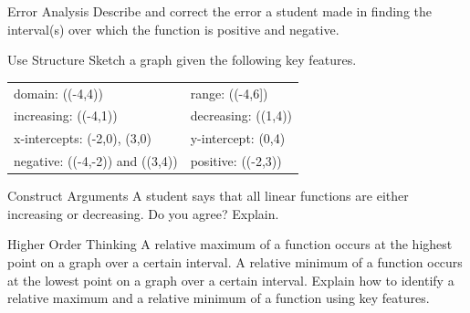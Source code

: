 \documentclass{article}
\newenvironment{practice}[2]{}{}        %
\newcommand{\answer}[1]{}               %
\newcommand{\placeholder}[2]{}          %
\newcommand{\te}[1]{}                   %
\begin{document}
\begin{practice}{13}{3}
Error Analysis Describe and correct the error a student made in finding the interval(s) over which the function is positive and negative.
\placeholder{graph}{Student-work error graphic on pale blue square grid: red downward parabola with vertex approximately (1,4) and x-intercepts -1 and 3; y-intercept approximately 3. Gray horizontal and vertical axes with arrowheads but no printed axis names, numbers, or tick labels. Red arrows on both descending curve ends. Student labels below: “positive: [-1,3]” and “negative: (-∞,-1) and (3,∞)”; large red X marks the work incorrect.}
\answer{The zeros, or values along the x-axis, are neither positive nor negative. These values should not be included in the interval over which the function is positive. The function is positive on the interval ((-1,3)) and negative on the intervals ((-\infty,-1)) and ((3,\infty)).}
\end{practice}
\begin{practice}{14}{3}
Use Structure Sketch a graph given the following key features.
\begin{tabular}{ll}
domain: ((-4,4)) & range: ((-4,6]) \\
increasing: ((-4,1)) & decreasing: ((1,4)) \\
x-intercepts: (-2,0), (3,0) & y-intercept: (0,4) \\
negative: ((-4,-2)) and ((3,4)) & positive: ((-2,3)) \\
\end{tabular}
\answer{See graph.}
\placeholder{graph}{Printed answer on PDF page 21: red polyline from open endpoint (-4,-4) through (-2,0) and (0,4) to peak (1,6), then through (3,0) to open endpoint (4,-3). No arrows on polyline. Unit square grid, visible window approximately x=-5 to 5 and y=-4 to 6. Axes x/y arrowed, origin O; x labels -4, -2, 2, 4 and y labels -2, 2, 4.}
\te{The printed answer for this item is on PDF page 21.}
\end{practice}
\begin{practice}{15}{3}
Construct Arguments A student says that all linear functions are either increasing or decreasing. Do you agree? Explain.
\answer{No; linear functions can also be constant, which means neither increasing nor decreasing.}
\te{Answer printed on PDF page 21.}
\end{practice}
\begin{practice}{16}{3}
Higher Order Thinking A relative maximum of a function occurs at the highest point on a graph over a certain interval. A relative minimum of a function occurs at the lowest point on a graph over a certain interval. Explain how to identify a relative maximum and a relative minimum of a function using key features.
\answer{A relative maximum occurs when a function changes from increasing to decreasing. A relative minimum occurs when a function changes from decreasing to increasing.}
\te{Answer printed on PDF page 21.}
\end{practice}
\end{document}
